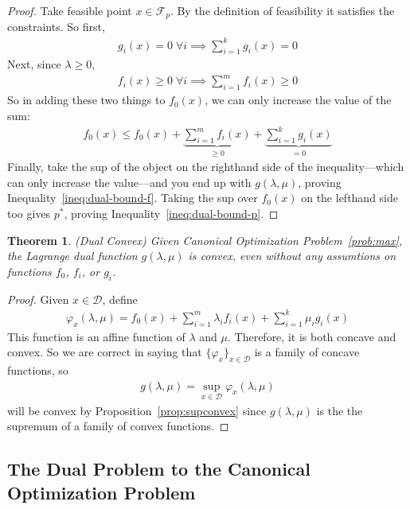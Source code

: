 \documentclass[12pt]{article}
\numberwithin{equation}{section} %
\theoremstyle{plain}
\newtheorem{thm}{Theorem}[section]
\theoremstyle{definition}
\theoremstyle{remark}
\begin{document}
\begin{proof}
Take feasible point $x\in \mathscr{F}_p$. By the definition of
feasibility it satisfies the constraints. So first,
\begin{align*}
  g_i(x)=0 \; \forall i
  \implies
  \sum_{i=1}^k g_i(x) = 0
\end{align*}
Next, since $\lambda\geq 0$,
\begin{align*}
  f_i(x) \geq 0 \; \forall i
  \implies
  \sum_{i=1}^m f_i(x) \geq 0
\end{align*}
So in adding these two things to $f_0(x)$, we can only increase the
value of the sum:
\begin{align*}
  f_0(x) \leq f_0(x)
  + \underbrace{\sum_{i=1}^m f_i(x)}_{\geq 0}
  + \underbrace{\sum_{i=1}^k g_i(x)}_{=0}
\end{align*}
Finally, take the sup of the object on the righthand side of the
inequality---which can only increase the value---and you end up with
$g(\lambda,\mu)$, proving Inequality~\ref{ineq:dual-bound-f}. Taking the
sup over $f_0(x)$ on the lefthand side too gives $p^*$, proving
Inequality~\ref{ineq:dual-bound-p}.
\end{proof}

\begin{thm}{\emph{(Dual Convex)}}
\label{thm:dual-convex}
Given Canonical Optimization Problem~\ref{prob:max}, the Lagrange dual
function $g(\lambda,\mu)$ is \emph{convex}, even without any assumtions
on functions $f_0$, $f_i$, or $g_i$.
\end{thm}
\begin{proof}
Given $x\in\mathcal{D}$, define
\begin{align*}
  \varphi_x(\lambda,\mu) = f_0(x)
    + \sum^m_{i=1} \lambda_i f_i(x)
    + \sum^k_{i=1} \mu_i g_i(x)
\end{align*}
This function is an affine function of $\lambda$ and $\mu$. Therefore,
it is both concave and convex. So we are correct in saying that
$\{\varphi_x\}_{x\in\mathcal{D}}$ is a family of concave functions, so
\begin{align*}
  g(\lambda,\mu) = \sup_{x\in\mathcal{D}} \varphi_x(\lambda,\mu)
\end{align*}
will be convex by Proposition~\ref{prop:supconvex} since
$g(\lambda,\mu)$ is the the supremum of a family of convex functions.

\end{proof}

\subsection{The Dual Problem to the Canonical Optimization Problem}
\end{document}
